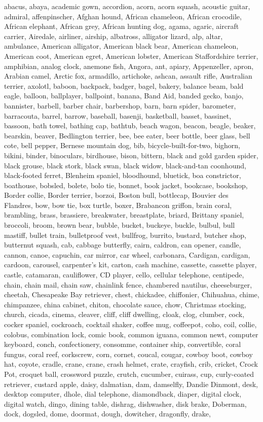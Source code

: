 abacus, abaya, academic gown, accordion, acorn, acorn squash, acoustic guitar, admiral, affenpinscher, Afghan hound, African chameleon, African crocodile, African elephant, African grey, African hunting dog, agama, agaric, aircraft carrier, Airedale, airliner, airship, albatross, alligator lizard, alp, altar, ambulance, American alligator, American black bear, American chameleon, American coot, American egret, American lobster, American Staffordshire terrier, amphibian, analog clock, anemone fish, Angora, ant, apiary, Appenzeller, apron, Arabian camel, Arctic fox, armadillo, artichoke, ashcan, assault rifle, Australian terrier, axolotl, baboon, backpack, badger, bagel, bakery, balance beam, bald eagle, balloon, ballplayer, ballpoint, banana, Band Aid, banded gecko, banjo, bannister, barbell, barber chair, barbershop, barn, barn spider, barometer, barracouta, barrel, barrow, baseball, basenji, basketball, basset, bassinet, bassoon, bath towel, bathing cap, bathtub, beach wagon, beacon, beagle, beaker, bearskin, beaver, Bedlington terrier, bee, bee eater, beer bottle, beer glass, bell cote, bell pepper, Bernese mountain dog, bib, bicycle-built-for-two, bighorn, bikini, binder, binoculars, birdhouse, bison, bittern, black and gold garden spider, black grouse, black stork, black swan, black widow, black-and-tan coonhound, black-footed ferret, Blenheim spaniel, bloodhound, bluetick, boa constrictor, boathouse, bobsled, bolete, bolo tie, bonnet, book jacket, bookcase, bookshop, Border collie, Border terrier, borzoi, Boston bull, bottlecap, Bouvier des Flandres, bow, bow tie, box turtle, boxer, Brabancon griffon, brain coral, brambling, brass, brassiere, breakwater, breastplate, briard, Brittany spaniel, broccoli, broom, brown bear, bubble, bucket, buckeye, buckle, bulbul, bull mastiff, bullet train, bulletproof vest, bullfrog, burrito, bustard, butcher shop, butternut squash, cab, cabbage butterfly, cairn, caldron, can opener, candle, cannon, canoe, capuchin, car mirror, car wheel, carbonara, Cardigan, cardigan, cardoon, carousel, carpenter's kit, carton, cash machine, cassette, cassette player, castle, catamaran, cauliflower, CD player, cello, cellular telephone, centipede, chain, chain mail, chain saw, chainlink fence, chambered nautilus, cheeseburger, cheetah, Chesapeake Bay retriever, chest, chickadee, chiffonier, Chihuahua, chime, chimpanzee, china cabinet, chiton, chocolate sauce, chow, Christmas stocking, church, cicada, cinema, cleaver, cliff, cliff dwelling, cloak, clog, clumber, cock, cocker spaniel, cockroach, cocktail shaker, coffee mug, coffeepot, coho, coil, collie, colobus, combination lock, comic book, common iguana, common newt, computer keyboard, conch, confectionery, consomme, container ship, convertible, coral fungus, coral reef, corkscrew, corn, cornet, coucal, cougar, cowboy boot, cowboy hat, coyote, cradle, crane, crane, crash helmet, crate, crayfish, crib, cricket, Crock Pot, croquet ball, crossword puzzle, crutch, cucumber, cuirass, cup, curly-coated retriever, custard apple, daisy, dalmatian, dam, damselfly, Dandie Dinmont, desk, desktop computer, dhole, dial telephone, diamondback, diaper, digital clock, digital watch, dingo, dining table, dishrag, dishwasher, disk brake, Doberman, dock, dogsled, dome, doormat, dough, dowitcher, dragonfly, drake, 